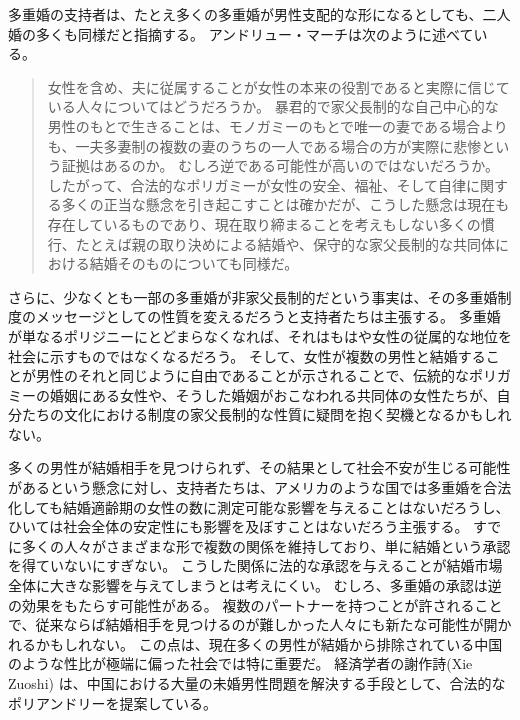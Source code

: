 \documentclass[paper=a4,book,openany]{jlreq} \usepackage{mystyle}
\begin{document}
多重婚の支持者は、たとえ多くの多重婚が男性支配的な形になるとしても、二人婚の多くも同様だと指摘する。
アンドリュー・マーチは次のように述べている。

\begin{quote}
女性を含め、夫に従属することが女性の本来の役割であると実際に信じている人々についてはどうだろうか。
暴君的で家父長制的な自己中心的な男性のもとで生きることは、モノガミーのもとで唯一の妻である場合よりも、一夫多妻制の複数の妻のうちの一人である場合の方が実際に悲惨という証拠はあるのか。
むしろ逆である可能性が高いのではないだろうか。
したがって、合法的なポリガミーが女性の安全、福祉、そして自律に関する多くの正当な懸念を引き起こすことは確かだが、こうした懸念は現在も存在しているものであり、現在取り締まることを考えもしない多くの慣行、たとえば親の取り決めによる結婚や、保守的な家父長制的な共同体における結婚そのものについても同様だ。
\citep[p.260]{march11:_is_there_right_polyg}
\end{quote}

さらに、少なくとも一部の多重婚が非家父長制的だという事実は、その多重婚制度のメッセージとしての性質を変えるだろうと支持者たちは主張する。
多重婚が単なるポリジニーにとどまらなくなれば、それはもはや女性の従属的な地位を社会に示すものではなくなるだろう。
そして、女性が複数の男性と結婚することが男性のそれと同じように自由であることが示されることで、伝統的なポリガミーの婚姻にある女性や、そうした婚姻がおこなわれる共同体の女性たちが、自分たちの文化における制度の家父長制的な性質に疑問を抱く契機となるかもしれない。

多くの男性が結婚相手を見つけられず、その結果として社会不安が生じる可能性があるという懸念に対し、支持者たちは、アメリカのような国では多重婚を合法化しても結婚適齢期の女性の数に測定可能な影響を与えることはないだろうし、ひいては社会全体の安定性にも影響を及ぼすことはないだろう主張する。
すでに多くの人々がさまざまな形で複数の関係を維持しており、単に結婚という承認を得ていないにすぎない。
こうした関係に法的な承認を与えることが結婚市場全体に大きな影響を与えてしまうとは考えにくい。
むしろ、多重婚の承認は逆の効果をもたらす可能性がある。
複数のパートナーを持つことが許されることで、従来ならば結婚相手を見つけるのが難しかった人々にも新たな可能性が開かれるかもしれない。
この点は、現在多くの男性が結婚から排除されている中国のような性比が極端に偏った社会では特に重要だ。
経済学者の謝作詩(Xie Zuoshi) は、中国における大量の未婚男性問題を解決する手段として、合法的なポリアンドリーを提案している\citep{weller15:_econom_has_contr_solut_china}。
\end{document}
